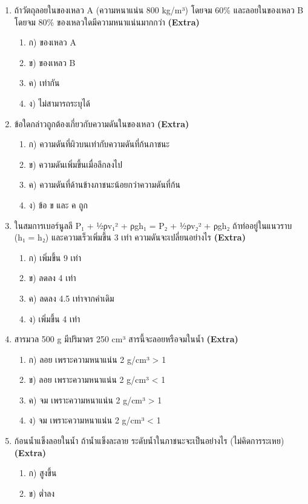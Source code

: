 \documentclass[12pt]{article}
\begin{document}
\begin{enumerate}[label=\arabic*.]
\item ถ้าวัตถุลอยในของเหลว A (ความหนาแน่น 800 kg/m³) โดยจม 60\% และลอยในของเหลว B โดยจม 80\% ของเหลวใดมีความหนาแน่นมากกว่า \hfill \textbf{\small (Extra)}
\begin{enumerate}[label=)]
\item ก) ของเหลว A
\item ข) ของเหลว B
\item ค) เท่ากัน
\item ง) ไม่สามารถระบุได้
\end{enumerate}
\item ข้อใดกล่าวถูกต้องเกี่ยวกับความดันในของเหลว \hfill \textbf{\small (Extra)}
\begin{enumerate}[label=)]
\item ก) ความดันที่ผิวบนเท่ากับความดันที่ก้นภาชนะ
\item ข) ความดันเพิ่มขึ้นเมื่อลึกลงไป
\item ค) ความดันที่ด้านข้างภาชนะน้อยกว่าความดันที่ก้น
\item ง) ข้อ ข และ ค ถูก
\end{enumerate}
\item ในสมการเบอร์นูลลี P₁ + ½ρv₁² + ρgh₁ = P₂ + ½ρv₂² + ρgh₂ ถ้าท่ออยู่ในแนวราบ (h₁ = h₂) และความเร็วเพิ่มขึ้น 3 เท่า ความดันจะเปลี่ยนอย่างไร \hfill \textbf{\small (Extra)}
\begin{enumerate}[label=)]
\item ก) เพิ่มขึ้น 9 เท่า
\item ข) ลดลง 4 เท่า
\item ค) ลดลง 4.5 เท่าจากค่าเดิม
\item ง) เพิ่มขึ้น 4 เท่า
\end{enumerate}
\item สารมวล 500 g มีปริมาตร 250 cm³ สารนี้จะลอยหรือจมในน้ำ \hfill \textbf{\small (Extra)}
\begin{enumerate}[label=)]
\item ก) ลอย เพราะความหนาแน่น 2 g/cm³ > 1
\item ข) ลอย เพราะความหนาแน่น 2 g/cm³ < 1
\item ค) จม เพราะความหนาแน่น 2 g/cm³ > 1
\item ง) จม เพราะความหนาแน่น 2 g/cm³ < 1
\end{enumerate}
\item ก้อนน้ำแข็งลอยในน้ำ ถ้าน้ำแข็งละลาย ระดับน้ำในภาชนะจะเป็นอย่างไร (ไม่คิดการระเหย) \hfill \textbf{\small (Extra)}
\begin{enumerate}[label=)]
\item ก) สูงขึ้น
\item ข) ต่ำลง

\end{enumerate}
\end{enumerate}
\end{document}
